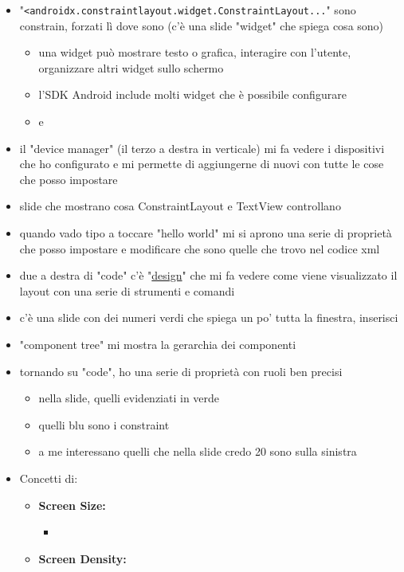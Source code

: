 \begin{itemize}
    \item "\texttt{<androidx.constraintlayout.widget.ConstraintLayout...}" sono constrain, forzati lì dove sono (c'è una slide "widget" che spiega cosa sono)
    \begin{itemize}
        \item una widget può mostrare testo o grafica, interagire con l'utente, organizzare altri widget sullo schermo
        \item l'SDK Android include molti widget che è possibile configurare
        \item e
    \end{itemize}
    \item il "device manager" (il terzo a destra in verticale) mi fa vedere i dispositivi che ho configurato e mi permette di aggiungerne di nuovi con tutte le cose che posso impostare
    \item slide che mostrano cosa ConstraintLayout e TextView controllano
    \item quando vado tipo a toccare "hello world" mi si aprono una serie di proprietà che posso impostare e modificare che sono quelle che trovo nel codice xml
    \item due a destra di "code" c'è "\underline{design}" che mi fa vedere come viene visualizzato il layout con una serie di strumenti e comandi
    \item c'è una slide con dei numeri verdi che spiega un po' tutta la finestra, inserisci
    \item "component tree" mi mostra la gerarchia dei componenti
    \item tornando su "code", ho una serie di proprietà con ruoli ben precisi
    \begin{itemize}
        \item nella slide, quelli evidenziati in verde
        \item quelli blu sono i constraint
        \item a me interessano quelli che nella slide credo 20 sono sulla sinistra
    \end{itemize}
    \item Concetti di:
    \begin{itemize}
        \item \textbf{Screen Size:}
        \begin{itemize}
            \item 
        \end{itemize}
        \item \textbf{Screen Density:}

\end{itemize}
\end{itemize}
